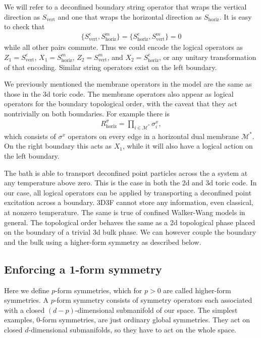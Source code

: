 \documentclass[twocolumn, longbibliography]{revtex4-2}
\renewcommand{\vert}{\text{vert}}
\newcommand{\horiz}{\text{horiz}}
\begin{document}
We will refer to a deconfined boundary string operator that wraps the vertical direction as $S_\vert$ and one that wraps the horizontal direction as $S_\horiz$. It is easy to check that 
\begin{align}
\{S^e_\vert,S^m_\horiz\}=\{S^e_\horiz,S^m_\vert\}=0
\end{align}
while all other pairs commute. Thus we could encode the logical operators as $Z_1=S^e_\vert$, $X_1 = S^m_\horiz$, $Z_2 = S^m_\vert$, and $X_2 = S^e_\horiz$, or any unitary transformation of that encoding. Similar string operators exist on the left boundary.

We previously mentioned the membrane operators in the model are the same as those in the 3d toric code. The membrane operators also appear as logical operators for the boundary topological order, with the caveat that they act nontrivially on both boundaries. For example there is 
\begin{align}
R^\sigma_\horiz = \prod_{i\in \mathcal{M}^*} \sigma^x_i,
\end{align}
which consists of $\sigma^x$ operators on every edge in a horizontal dual membrane $\mathcal{M}^*$. On the right boundary this acts as $X_1$, while it will also have a logical action on the left boundary.

The bath is able to transport deconfined point particles across the a system at any temperature above zero. This is the case in both the 2d and 3d toric code. In our case, all logical operators can be applied by transporting a deconfined point excitation across a boundary. 3D3F cannot store any information, even classical, at nonzero temperature. The same is true of confined Walker-Wang models in general. The topological order behaves the same as a 2d topological phase placed on the boundary of a trivial 3d bulk phase. We can however couple the boundary and the bulk using a higher-form symmetry as described below.

\subsection{Enforcing a 1-form symmetry} \label{sub:1form}

Here we define $p$-form symmetries, which for $p>0$ are called higher-form symmetries. A $p$-form symmetry consists of symmetry operators each associated with a closed $(d-p)$-dimensional submanifold of our space. The simplest examples, 0-form symmetries, are just ordinary global symmetries. They act on closed $d$-dimensional submanifolds, so they have to act on the whole space.
\end{document}
